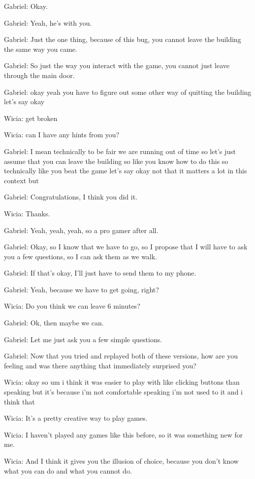 Gabriel: Okay.

Gabriel: Yeah, he's with you.

Gabriel: Just the one thing, because of this bug, you cannot leave the building the same way you came.

Gabriel: So just the way you interact with the game, you cannot just leave through the main door.

Gabriel: okay yeah you have to figure out some other way of quitting the building let's say okay

Wicia: get broken

Wicia: can I have any hints from you?

Gabriel: I mean technically to be fair we are running out of time so let's just assume that you can leave the building so like you know how to do this so technically like you beat the game let's say okay not that it matters a lot in this context but

Gabriel: Congratulations, I think you did it.

Wicia: Thanks.

Gabriel: Yeah, yeah, yeah, so a pro gamer after all.

Gabriel: Okay, so I know that we have to go, so I propose that I will have to ask you a few questions, so I can ask them as we walk.

Gabriel: If that's okay, I'll just have to send them to my phone.

Gabriel: Yeah, because we have to get going, right?

Wicia: Do you think we can leave 6 minutes?

Gabriel: Ok, then maybe we can.

Gabriel: Let me just ask you a few simple questions.

Gabriel: Now that you tried and replayed both of these versions, how are you feeling and was there anything that immediately surprised you?

Wicia: okay so um i think it was easier to play with like clicking buttons than speaking but it's because i'm not comfortable speaking i'm not used to it and i think that

Wicia: It's a pretty creative way to play games.

Wicia: I haven't played any games like this before, so it was something new for me.

Wicia: And I think it gives you the illusion of choice, because you don't know what you can do and what you cannot do.

